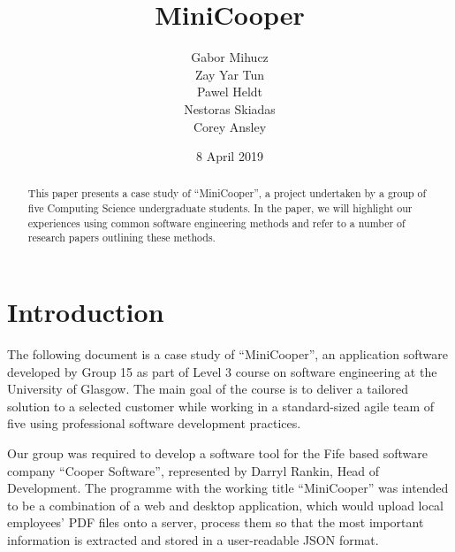 \documentclass{l3proj}
\begin{document}
\title{MiniCooper}

\author{Gabor Mihucz \\
        Zay Yar Tun \\
        Pawel Heldt \\
        Nestoras Skiadas \\
        Corey Ansley}

\date{8 April 2019}

\maketitle

\begin{abstract}

This paper presents a case study of ``MiniCooper'', a project undertaken by a group of five Computing Science undergraduate students. In the paper, we will highlight our experiences using common software engineering methods and refer to a number of research papers outlining these methods.

\end{abstract}

\educationalconsent

\newpage

\section{Introduction}

The following document is a case study of ``MiniCooper'', an application software developed by Group 15 as part of Level 3 course on software engineering at the University of Glasgow. The main goal of the course is to deliver a tailored solution to a selected customer while working in a standard-sized agile team of five using professional software development practices.

Our group was required to develop a software tool for the Fife based software company ``Cooper Software'', represented by  Darryl Rankin, Head of Development. The programme with the working title ``MiniCooper'' was intended to be a combination of a web and desktop application, which would upload local employees’ PDF files onto a server, process them so that the most important information is extracted and stored in a user-readable JSON format.
\end{document}
